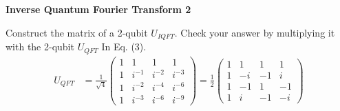 \documentclass[a4paper, 10pt]{article}
\begin{document}
\begin{problem}
\textbf{Inverse Quantum Fourier Transform 2}
\par Construct the matrix of a 2-qubit \( U_{IQFT} \).
Check your answer by multiplying it with the 2-qubit \( U_{QFT} \) In Eq. (3).
\begin{align}
	U_{QFT} & = \frac{1}{\sqrt{4}} \begin{pmatrix}
		                               1 & 1      & 1      & 1      \\
		                               1 & i^{-1} & i^{-2} & i^{-3} \\
		                               1 & i^{-2} & i^{-4} & i^{-6} \\
		                               1 & i^{-3} & i^{-6} & i^{-9}
	                               \end{pmatrix} = \frac{1}{2} \begin{pmatrix}
		                                                           1 & 1  & 1  & 1  \\
		                                                           1 & -i & -1 & i  \\
		                                                           1 & -1 & 1  & -1 \\
		                                                           1 & i  & -1 & -i
	                                                           \end{pmatrix}
\end{align}
\end{problem}
\end{document}

